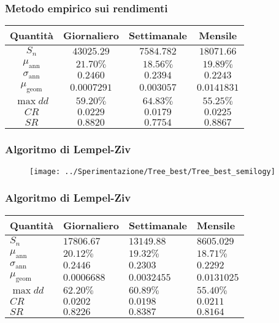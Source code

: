 \documentclass{beamer}
\theoremstyle{plain}
\theoremstyle{definition}
\theoremstyle{remark}
\begin{document}
\begin{frame}
\frametitle{Metodo empirico sui rendimenti}
\begin{table}[H]
\centering
\begin{tabular}{|c|c|c|c|}
\hline
Quantità 			  & Giornaliero	 & Settimanale	& Mensile		\\\hline
$S_n$                 & $43025.29$   & $7584.782$	& $18071.66$ 	\\
$\mu_{\text{ann}}$    & $21.70\%$    & $18.56\%$	& $19.89\%$		\\
$\sigma_{\text{ann}}$ & $0.2460$     & $0.2394$		& $0.2243$		\\
$\mu_{\text{geom}}$   & $0.0007291$  & $0.003057$	& $0.0141831$	\\
$\max dd$             & $59.20\%$    & $64.83\%$	& $55.25\%$		\\
$CR$                  & $0.0229$     & $0.0179$		& $0.0225$		\\
$SR$                  & $0.8820$     & $0.7754$		& $0.8867$		\\\hline
\end{tabular}
\end{table}
\end{frame}

\begin{frame}
\frametitle{Algoritmo di Lempel-Ziv}
\begin{figure}
\centering
\texttt{[image: ../Sperimentazione/Tree\_best/Tree\_best\_semilogy]}
\caption{}
\label{fig:treebestsemilogy}
\end{figure}
\end{frame}

\begin{frame}
\frametitle{Algoritmo di Lempel-Ziv}
\begin{table}
\centering
\begin{tabular}{|l|l|l|l|}
\hline
Quantità 			  & Giornaliero	 & Settimanale	& Mensile		\\\hline
$S_n$                 & $17806.67$   & $13149.88$	& $8605.029$ 	\\
$\mu_{\text{ann}}$    & $20.12\%$    & $19.32\%$	& $18.71\%$		\\
$\sigma_{\text{ann}}$ & $0.2446$     & $0.2303$		& $0.2292$		\\
$\mu_{\text{geom}}$   & $0.0006688$  & $0.0032455$	& $0.0131025$	\\
$\max dd$             & $62.20\%$    & $60.89\%$	& $55.40\%$		\\
$CR$                  & $0.0202$     & $0.0198$		& $0.0211$		\\
$SR$                  & $0.8226$     & $0.8387$		& $0.8164$		\\\hline
\end{tabular}
\end{table}

\end{frame}
\end{document}
